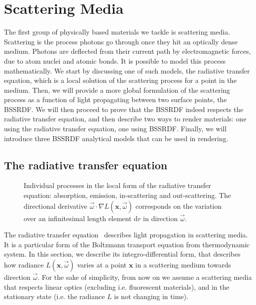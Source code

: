\section{Scattering Media}
\label{sec:scatteringtheory}
The first group of physically based materials we tackle is scattering media. Scattering is the process photons go through once they hit an optically dense medium. Photons are deflected from their current path by electromagnetic forces, due to atom nuclei and atomic bonds. It is possible to model this process mathematically. We start by discussing one of such models, the radiative transfer equation, which is a local solution of the scattering process for a point in the medium. Then, we will provide a more global formulation of the scattering process as a function of light propagating between two surface points, the BSSRDF. We will then proceed to prove that the BSSRDF indeed respects the radiative transfer equation, and then describe two ways to render materials: one using the radiative transfer equation, one using BSSRDF. Finally, we will introduce three BSSRDF analytical models that can be used in rendering.

\subsection{The radiative transfer equation}
\label{sec:radiativetransfer}
\begin{figure}
\centering
{}
\caption{Individual processes in the local form of the radiative transfer equation: absorption, emission, in-scattering and out-scattering. The directional derivative $\vec{\omega} \cdot \nabla L(\mathbf{x}, \vec{\omega})$ corresponds on the variation over an infinitesimal length element $\text{d}r$ in direction $\vec{\omega}$. } 
\label{fig:rte_elements}
\end{figure}
The radiative transfer equation~\cite{Chandrasekhar1950} describes light propagation in scattering media. It is a particular form of the Boltzmann transport equation from thermodynamic system. In this section, we describe its integro-differential form, that describes how radiance $L(\mathbf{x}, \vec{\omega})$ varies at a point $\mathbf{x}$ in a scattering medium towards direction $\vec{\omega}$. For the sake of simplicity, from now on we assume a scattering media that respects linear optics (excluding i.e. fluorescent materials), and in the stationary state (i.e. the radiance $L$ is not changing in time). 

